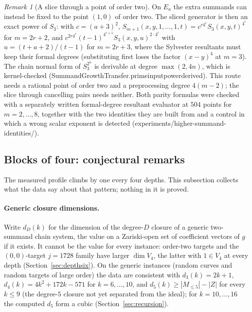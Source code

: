 \documentclass[11pt]{article}
\theoremstyle{definition}\newtheorem{definition}[theorem]{Definition}
\theoremstyle{remark}\newtheorem{remark}[theorem]{Remark}
\newcommand{\codeus}{\textunderscore\allowbreak}
\newcommand{\code}[1]{{\ttfamily\let\_\codeus#1}}
\begin{document}
\begin{remark}[A slice through a point of order two]\label{rem:ordertwoslice}
On $E_a$ the extra summands can instead be fixed to the point $(1,0)$ of
order two. The sliced generator is then an exact power of $S_3$:
with $c=(a+3)^2$, $S_{m+1}(x,y,1,\ldots,1,t)=c^{r4^r}S_3(x,y,t)^{4^r}$ for
$m=2r+2$, and $c^{2r4^r}(t-1)^{4^{r+1}}S_3(x,y,u)^{2\cdot4^r}$ with
$u=(t+a+2)/(t-1)$ for $m=2r+3$, where the Sylvester resultants must keep
their formal degrees (substituting first loses the factor $(x-y)^4$ at
$m=3$). The chain normal form of $S_3^{2^n}$ is derivable at degree
$\max(2,4n)$, which is kernel-checked
(\code{SummandGrowthTransfer.prime\_input\_power\_derived}). This route
needs a rational point of order two and a preprocessing degree $4(m-2)$;
the slice through cancelling pairs needs neither. Both parity formulas were
checked with a separately written formal-degree resultant evaluator at
$504$ points for $m=2,\ldots,8$, together with the two identities they are
built from and a control in which a wrong scalar exponent is detected
(\code{experiments/higher-summand-identities/}).
\end{remark}

\subsection{Blocks of four: conjectural remarks}\label{sec:blockfour}
The measured profile climbs by one every four depths. This subsection
collects what the data say about that pattern; nothing in it is proved.

\paragraph{Generic closure dimensions.}
Write $d_D(k)$ for the dimension of the degree-$D$ closure of a generic
two-summand chain system, the value on a Zariski-open set of coefficient
vectors of $g$ if it exists. It cannot be the value for every instance:
order-two targets and the $(0,0)$-target $j=1728$ family have larger $\dim
V_4$, the latter with $1\in V_4$ at every depth (Section~\ref{sec:depthsix}).
On the generic instances (random curves and random targets of large order)
the data are consistent with $d_3(k)=2k+1$, $d_4(k)=4k^2+172k-571$ for
$k=6,\ldots,10$, and $d_5(k)\ge|M_{\le5}|-|Z|$ for every $k\le9$ (the
degree-$5$ closure not yet separated from the ideal); for $k=10,\ldots,16$
the computed $d_5$ form a cubic (Section~\ref{sec:recursion}).
\end{document}
